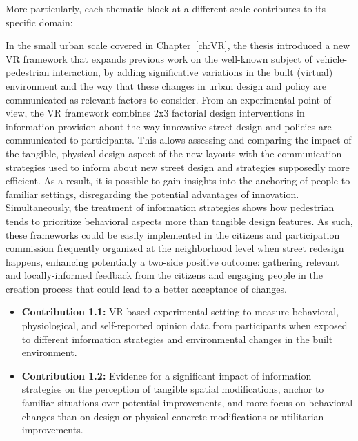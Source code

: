 More particularly, each thematic block at a different scale contributes to its specific domain:

In the small urban scale covered in Chapter~\ref{ch:VR}, the thesis introduced a new VR framework that expands previous work on the well-known subject of vehicle-pedestrian interaction, by adding significative variations in the built (virtual) environment and the way that these changes in urban design and policy are communicated as relevant factors to consider. From an experimental point of view, the VR framework combines 2x3 factorial design interventions in information provision about the way innovative street design and policies are communicated to participants. This allows assessing and comparing the impact of the tangible, physical design aspect of the new layouts with the communication strategies used to inform about new street design and strategies supposedly more efficient. As a result, it is possible to gain insights into the anchoring of people to familiar settings, disregarding the potential advantages of innovation. Simultaneously, the treatment of information strategies shows how pedestrian tends to prioritize behavioral aspects more than tangible design features. As such, these frameworks could be easily implemented in the citizens and participation commission frequently organized at the neighborhood level when street redesign happens, enhancing potentially a two-side positive outcome: gathering relevant and locally-informed feedback from the citizens and engaging people in the creation process that could lead to a better acceptance of changes.

\begin{itemize}
    \item \textbf{Contribution 1.1:} VR-based experimental setting to measure behavioral, physiological, and self-reported opinion data from participants when exposed to different information strategies and environmental changes in the built environment.
    \item \textbf{Contribution 1.2:} Evidence for a significant impact of information strategies on the perception of tangible spatial modifications, anchor to familiar situations over potential improvements, and more focus on behavioral changes than on design or physical concrete modifications or utilitarian improvements. 
\end{itemize}

